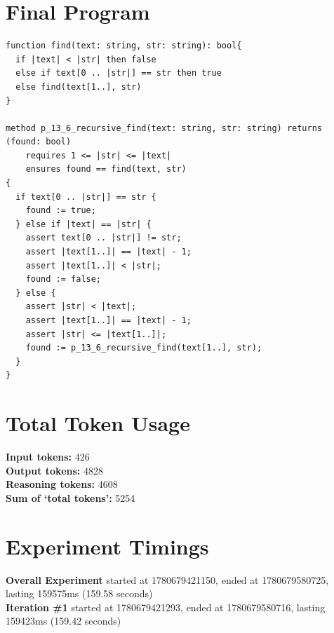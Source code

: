\documentclass{article}
\begin{document}
\section*{Final Program}
\begin{lstlisting}
function find(text: string, str: string): bool{
  if |text| < |str| then false
  else if text[0 .. |str|] == str then true
  else find(text[1..], str)
}

method p_13_6_recursive_find(text: string, str: string) returns (found: bool)
	requires 1 <= |str| <= |text|
	ensures found == find(text, str)
{
  if text[0 .. |str|] == str {
    found := true;
  } else if |text| == |str| {
    assert text[0 .. |str|] != str;
    assert |text[1..]| == |text| - 1;
    assert |text[1..]| < |str|;
    found := false;
  } else {
    assert |str| < |text|;
    assert |text[1..]| == |text| - 1;
    assert |str| <= |text[1..]|;
    found := p_13_6_recursive_find(text[1..], str);
  }
}
\end{lstlisting}
\section*{Total Token Usage}
\textbf{Input tokens: }426
\\\textbf{Output tokens: }4828
\\\textbf{Reasoning tokens: }4608
\\\textbf{Sum of `total tokens': }5254
\section*{Experiment Timings}
\textbf{Overall Experiment} started at 1780679421150, ended at 1780679580725, lasting 159575ms (159.58 seconds)
\\\textbf{Iteration \#1} started at 1780679421293, ended at 1780679580716, lasting 159423ms (159.42 seconds)
\end{document}
